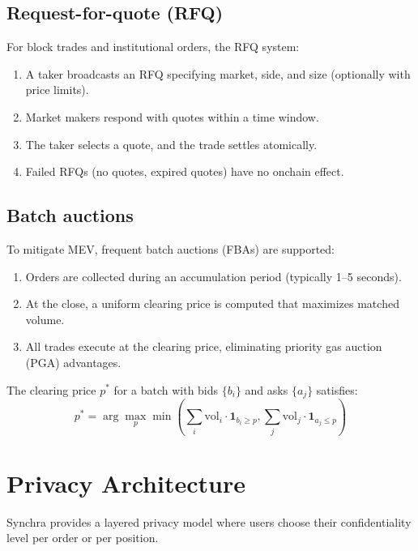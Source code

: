 \documentclass[11pt,a4paper]{article}
\begin{document}
\subsection{Request-for-quote (RFQ)}

For block trades and institutional orders, the RFQ system:
\begin{enumerate}
  \item A taker broadcasts an RFQ specifying market, side, and size (optionally with price limits).
  \item Market makers respond with quotes within a time window.
  \item The taker selects a quote, and the trade settles atomically.
  \item Failed RFQs (no quotes, expired quotes) have no onchain effect.
\end{enumerate}

\subsection{Batch auctions}

To mitigate MEV, frequent batch auctions (FBAs) are supported:
\begin{enumerate}
  \item Orders are collected during an accumulation period (typically 1--5 seconds).
  \item At the close, a uniform clearing price is computed that maximizes matched volume.
  \item All trades execute at the clearing price, eliminating priority gas auction (PGA) advantages.
\end{enumerate}

The clearing price $p^*$ for a batch with bids $\{b_i\}$ and asks $\{a_j\}$ satisfies:
\[
p^* = \arg\max_{p} \min\left(\sum_{i} \text{vol}_i \cdot \mathbf{1}_{b_i \geq p}, \sum_{j} \text{vol}_j \cdot \mathbf{1}_{a_j \leq p}\right)
\]

\section{Privacy Architecture}
\label{sec:privacy}

Synchra provides a layered privacy model where users choose their confidentiality level per order or per position.
\end{document}
